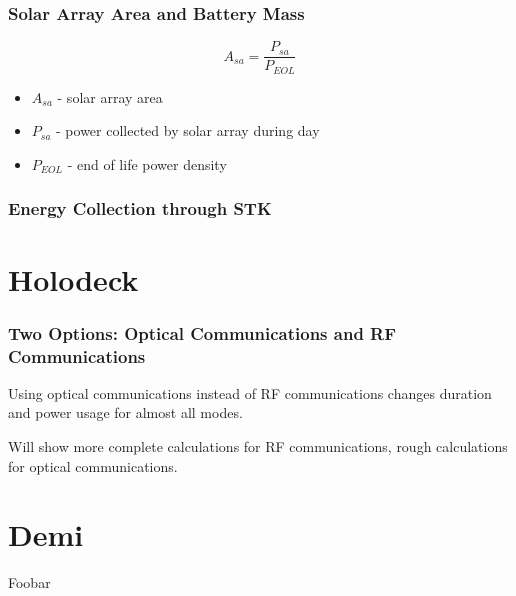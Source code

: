\documentclass{beamer}
\begin{document}
\begin{frame}
  \frametitle{Solar Array Area and Battery Mass}
  \[A_{sa} = \frac{P_{sa}}{P_{EOL}}\]

  \begin{itemize}
    \item $A_{sa}$ - solar array area
    \item $P_{sa}$ - power collected by solar array during day
    \item $P_{EOL}$ - end of life power density
  \end{itemize}
\end{frame}

\begin{frame}
  \frametitle{Energy Collection through STK}
\end{frame}

\section{Holodeck}
\begin{frame}
  \frametitle{Two Options: Optical Communications and RF Communications}
  \begin{center}
    Using optical communications instead of RF communications changes
    duration and power usage for almost all modes.

    Will show more complete calculations for RF communications, rough
    calculations for optical communications.
  \end{center}
\end{frame}

\section{Demi}

\begin{frame}
	Foobar
\end{frame}
\end{document}
